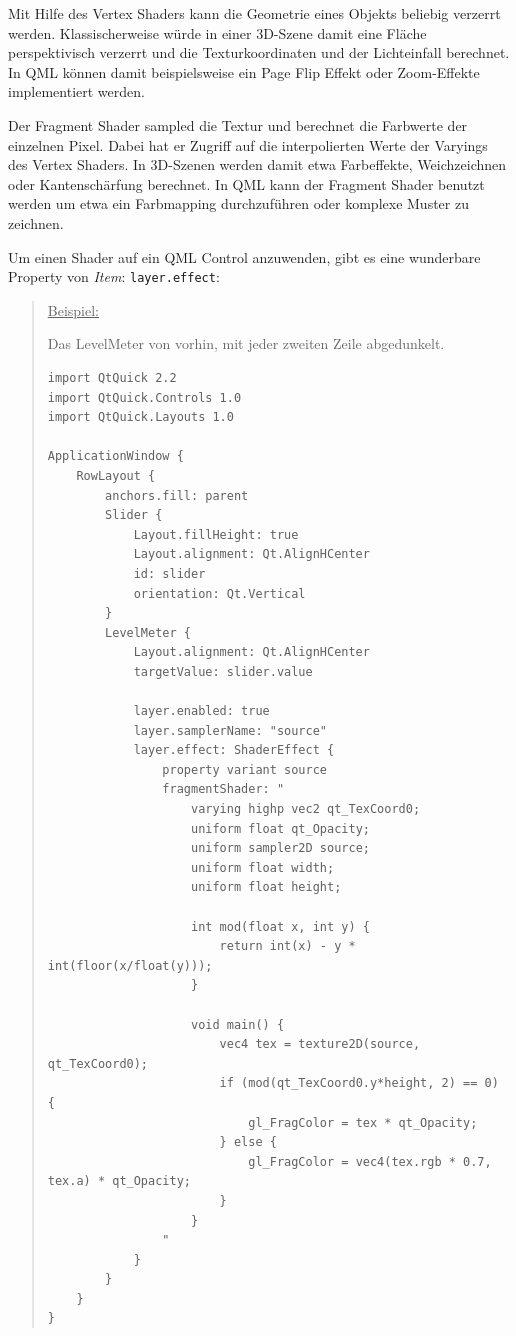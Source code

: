 \documentclass[a4paper]{article}
\begin{document}
Mit Hilfe des Vertex Shaders kann die Geometrie eines Objekts beliebig verzerrt werden. Klassischerweise würde in einer 3D-Szene damit eine Fläche perspektivisch verzerrt und die Texturkoordinaten und der Lichteinfall berechnet. In QML können damit beispielsweise ein Page Flip Effekt oder Zoom-Effekte implementiert werden.

Der Fragment Shader sampled die Textur und berechnet die Farbwerte der einzelnen Pixel. Dabei hat er Zugriff auf die interpolierten Werte der Varyings des Vertex Shaders. In 3D-Szenen werden damit etwa Farbeffekte, Weichzeichnen oder Kantenschärfung berechnet. In QML kann der Fragment Shader benutzt werden um etwa ein Farbmapping durchzuführen oder komplexe Muster zu zeichnen.

Um einen Shader auf ein QML Control anzuwenden, gibt es eine wunderbare Property von \emph{Item}: \verb~layer.effect~:

\begin{quote}
\uline{Beispiel:}

Das LevelMeter von vorhin, mit jeder zweiten Zeile abgedunkelt.

\begin{verbatim}
import QtQuick 2.2
import QtQuick.Controls 1.0
import QtQuick.Layouts 1.0

ApplicationWindow {
    RowLayout {
        anchors.fill: parent
        Slider {
            Layout.fillHeight: true
            Layout.alignment: Qt.AlignHCenter
            id: slider
            orientation: Qt.Vertical
        }
        LevelMeter {
            Layout.alignment: Qt.AlignHCenter
            targetValue: slider.value

            layer.enabled: true
            layer.samplerName: "source"
            layer.effect: ShaderEffect {
                property variant source
                fragmentShader: "
                    varying highp vec2 qt_TexCoord0;
                    uniform float qt_Opacity;
                    uniform sampler2D source;
                    uniform float width;
                    uniform float height;

                    int mod(float x, int y) {
                        return int(x) - y * int(floor(x/float(y)));
                    }

                    void main() {
                        vec4 tex = texture2D(source, qt_TexCoord0);
                        if (mod(qt_TexCoord0.y*height, 2) == 0) {
                            gl_FragColor = tex * qt_Opacity;
                        } else {
                            gl_FragColor = vec4(tex.rgb * 0.7, tex.a) * qt_Opacity;
                        }
                    }
                "
            }
        }
    }
}
\end{verbatim}
\end{quote}
\end{document}
